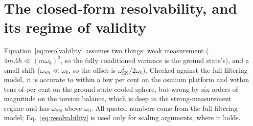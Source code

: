 \documentclass[aps,pra,reprint,amsmath,amssymb,superscriptaddress]{revtex4-2}
\begin{document}
\begin{table}[t]
  \centering
  \caption{All three platforms' parameters, with sources and assumptions
    (expanding Table~\ref{tab:platforms}).}
  \label{tab:platformsfull}
  
\end{table}

\section{The closed-form resolvability, and its regime of validity}
\label{app:resolvability}

Equation~\eqref{eq:resolvability} assumes two things: weak measurement
($4m\Lambda\hbar\ll(m\omega_0)^2$, so the fully conditioned variance is the
ground state's), and a small shift ($\omega_{\mathrm{SN}}\ll\omega_0$, so the
offset is $\omega_{\mathrm{SN}}^2/2\omega_0$). Checked against the full
filtering model, it is accurate to within a few per cent on the osmium
platform and within tens of per cent on the ground-state-cooled sphere, but
wrong by six orders of magnitude on the torsion balance, which is deep in
the strong-measurement regime and has $\omega_{\mathrm{SN}}$ above
$\omega_0$. All quoted numbers come from the full filtering model;
Eq.~\eqref{eq:resolvability} is used only for scaling arguments, where it
holds.

\clearpage


\end{document}
